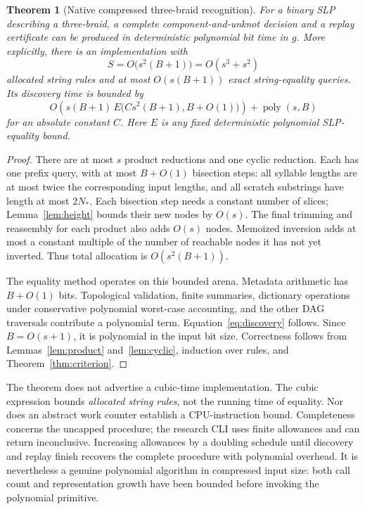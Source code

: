 \documentclass[11pt,letterpaper]{article}
\newtheorem{theorem}{Theorem}[section]
\theoremstyle{definition}\newtheorem{definition}[theorem]{Definition}
\theoremstyle{remark}\newtheorem{remark}[theorem]{Remark}
\newcommand{\poly}{\operatorname{poly}}
\begin{document}
\begin{theorem}[Native compressed three-braid recognition]\label{thm:main}
For a binary SLP describing a three-braid, a complete component-and-unknot decision and a replay certificate can be produced in deterministic polynomial bit time in $g$. More explicitly, there is an implementation with
\[
 S=O\bigl(s^2(B+1)\bigr)=O(s^3+s^2)
\]
allocated string rules and at most $O(s(B+1))$ exact string-equality queries. Its discovery time is bounded by
\begin{equation}\label{eq:discovery}
 O\!\left(s(B+1)\,E\bigl(C s^2(B+1),B+O(1)\bigr)\right)
 +\poly(s,B)
\end{equation}
for an absolute constant $C$. Here $E$ is any fixed deterministic polynomial SLP-equality bound.
\end{theorem}
\begin{proof}
There are at most $s$ product reductions and one cyclic reduction. Each has one prefix query, with at most $B+O(1)$ bisection steps: all syllable lengths are at most twice the corresponding input lengths, and all scratch substrings have length at most $2N_*$. Each bisection step needs a constant number of slices; Lemma~\ref{lem:height} bounds their new nodes by $O(s)$. The final trimming and reassembly for each product also adds $O(s)$ nodes. Memoized inversion adds at most a constant multiple of the number of reachable nodes it has not yet inverted. Thus total allocation is $O(s^2(B+1))$.

The equality method operates on this bounded arena. Metadata arithmetic has $B+O(1)$ bits. Topological validation, finite summaries, dictionary operations under conservative polynomial worst-case accounting, and the other DAG traversals contribute a polynomial term. Equation~\eqref{eq:discovery} follows. Since $B=O(s+1)$, it is polynomial in the input bit size. Correctness follows from Lemmas~\ref{lem:product} and~\ref{lem:cyclic}, induction over rules, and Theorem~\ref{thm:criterion}.
\end{proof}

The theorem does not advertise a cubic-time implementation. The cubic expression bounds \emph{allocated string rules}, not the running time of equality. Nor does an abstract work counter establish a CPU-instruction bound. Completeness concerns the uncapped procedure; the research CLI uses finite allowances and can return inconclusive. Increasing allowances by a doubling schedule until discovery and replay finish recovers the complete procedure with polynomial overhead. It is nevertheless a genuine polynomial algorithm in compressed input size: both call count and representation growth have been bounded before invoking the polynomial primitive.
\end{document}

